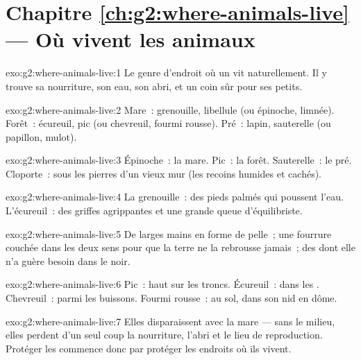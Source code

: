 \section*{Chapitre \ref{ch:g2:where-animals-live} --- Où vivent les animaux}

\begin{solution}{exo:g2:where-animals-live:1}
Le genre d'endroit où un  vit naturellement. Il y trouve sa
nourriture, son eau, son abri, et un coin sûr pour ses petits.
\end{solution}

\begin{solution}{exo:g2:where-animals-live:2}
Mare~: grenouille, libellule (ou épinoche, limnée). Forêt~:
écureuil, pic (ou chevreuil, fourmi rousse). Pré~: lapin,
sauterelle (ou papillon, mulot).
\end{solution}

\begin{solution}{exo:g2:where-animals-live:3}
Épinoche~: la mare. Pic~: la forêt. Sauterelle~: le pré. Cloporte~:
sous les pierres d'un vieux mur (les recoins humides et cachés).
\end{solution}

\begin{solution}{exo:g2:where-animals-live:4}
La grenouille~: des pieds palmés qui poussent l'eau. L'écureuil~:
des griffes agrippantes et une grande queue d'équilibriste.
\end{solution}

\begin{solution}{exo:g2:where-animals-live:5}
De larges mains en forme de pelle~; une fourrure couchée dans les
deux sens pour que la terre ne la rebrousse jamais~; des  dont
elle n'a guère besoin dans le noir.
\end{solution}

\begin{solution}{exo:g2:where-animals-live:6}
Pic~: haut sur les troncs. Écureuil~: dans les .
Chevreuil~: parmi les buissons. Fourmi rousse~: au sol, dans son
nid en dôme.
\end{solution}

\begin{solution}{exo:g2:where-animals-live:7}
Elles disparaissent avec la mare --- sans le milieu, elles perdent
d'un seul coup la nourriture, l'abri et le lieu de reproduction.
Protéger les  commence donc par protéger les endroits où ils
vivent.
\end{solution}

